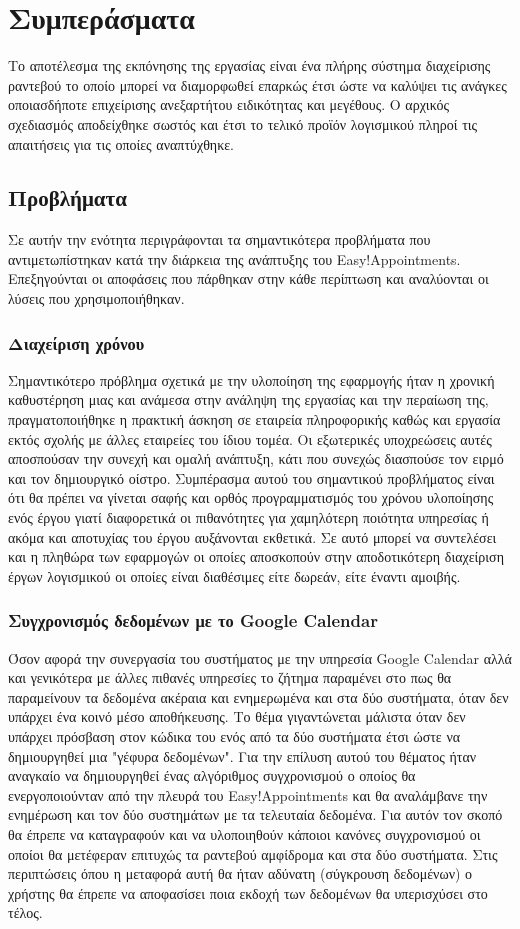 \chapter{Συμπεράσματα}
Το αποτέλεσμα της εκπόνησης της εργασίας είναι ένα πλήρης σύστημα διαχείρισης ραντεβού το οποίο μπορεί να διαμορφωθεί επαρκώς έτσι ώστε να καλύψει τις ανάγκες οποιασδήποτε επιχείρισης ανεξαρτήτου ειδικότητας και μεγέθους. Ο αρχικός σχεδιασμός αποδείχθηκε σωστός και έτσι το τελικό προϊόν λογισμικού πληροί τις απαιτήσεις για τις οποίες αναπτύχθηκε. 

\section{Προβλήματα}
Σε αυτήν την ενότητα περιγράφονται τα σημαντικότερα προβλήματα που αντιμετωπίστηκαν κατά την διάρκεια της ανάπτυξης του Easy!Appointments. Επεξηγούνται οι αποφάσεις που πάρθηκαν στην κάθε περίπτωση και αναλύονται οι λύσεις που χρησιμοποιήθηκαν.

\subsection{Διαχείριση χρόνου}
Σημαντικότερο πρόβλημα σχετικά με την υλοποίηση της εφαρμογής ήταν η χρονική καθυστέρηση μιας και ανάμεσα στην ανάληψη της εργασίας και την περαίωση της, πραγματοποιήθηκε η πρακτική άσκηση σε εταιρεία πληροφορικής καθώς και εργασία εκτός σχολής με άλλες εταιρείες του ίδιου τομέα. Οι εξωτερικές υποχρεώσεις αυτές αποσπούσαν την συνεχή και ομαλή ανάπτυξη, κάτι που συνεχώς διασπούσε τον ειρμό και τον δημιουργικό οίστρο. Συμπέρασμα αυτού του σημαντικού προβλήματος είναι ότι θα πρέπει να γίνεται σαφής και ορθός προγραμματισμός του χρόνου υλοποίησης ενός έργου γιατί διαφορετικά οι πιθανότητες για χαμηλότερη ποιότητα υπηρεσίας ή ακόμα και αποτυχίας του έργου αυξάνονται εκθετικά. Σε αυτό μπορεί να συντελέσει και η πληθώρα των εφαρμογών οι οποίες αποσκοπούν στην αποδοτικότερη διαχείριση έργων λογισμικού οι οποίες είναι διαθέσιμες είτε δωρεάν, είτε έναντι αμοιβής.

\subsection{Συγχρονισμός δεδομένων με το Google Calendar}
Όσον αφορά την συνεργασία του συστήματος με την υπηρεσία Google Calendar αλλά και γενικότερα με άλλες πιθανές υπηρεσίες το ζήτημα παραμένει στο πως θα παραμείνουν τα δεδομένα ακέραια και ενημερωμένα και στα δύο συστήματα, όταν δεν υπάρχει ένα κοινό μέσο αποθήκευσης. Το θέμα γιγαντώνεται μάλιστα όταν δεν υπάρχει πρόσβαση στον κώδικα του ενός από τα δύο συστήματα έτσι ώστε να δημιουργηθεί μια "γέφυρα δεδομένων". Για την επίλυση αυτού του θέματος ήταν αναγκαίο να δημιουργηθεί ένας αλγόριθμος συγχρονισμού ο οποίος θα ενεργοποιούνταν από την πλευρά του Easy!Appointments και θα αναλάμβανε την ενημέρωση και τον δύο συστημάτων με τα τελευταία δεδομένα. Για αυτόν τον σκοπό θα έπρεπε να καταγραφούν και να υλοποιηθούν κάποιοι κανόνες συγχρονισμού οι οποίοι θα μετέφεραν επιτυχώς τα ραντεβού αμφίδρομα και στα δύο συστήματα. Στις περιπτώσεις όπου η μεταφορά αυτή θα ήταν αδύνατη (σύγκρουση δεδομένων) ο χρήστης θα έπρεπε να αποφασίσει ποια εκδοχή των δεδομένων θα υπερισχύσει στο τέλος.

